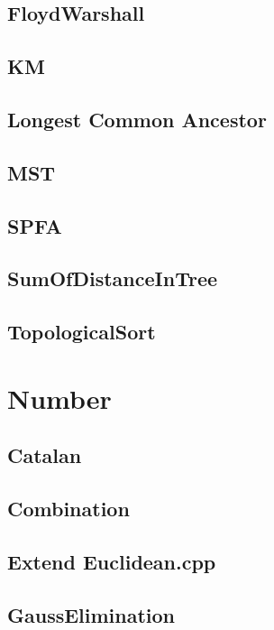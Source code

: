 \subsection{FloydWarshall}

\subsection{KM}

\subsection{Longest Common Ancestor}

\subsection{MST}

\subsection{SPFA}

\subsection{SumOfDistanceInTree}

\subsection{TopologicalSort}


\section{Number}

\subsection{Catalan}

\subsection{Combination}

\subsection{Extend Euclidean.cpp}

\subsection{GaussElimination}

